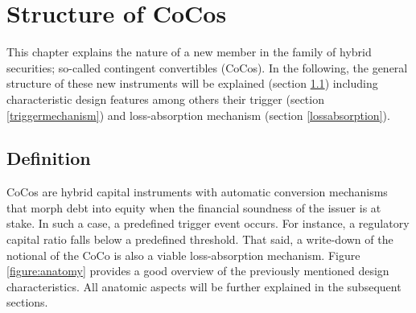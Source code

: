 \chapter{Structure of CoCos}

This chapter explains the nature of a new member in the family of hybrid securities; so-called contingent convertibles (CoCos). In the following, the general structure of these new instruments will be explained (section \ref{definitioncocos}) including characteristic design features among others their trigger (section \ref{triggermechanism}) and loss-absorption mechanism (section \ref{lossabsorption}).

\section{Definition}\label{definitioncocos}

CoCos are hybrid capital instruments with automatic conversion mechanisms that morph debt into equity when the financial soundness of the issuer is at stake. In such a case, a predefined trigger event occurs. For instance, a regulatory capital ratio falls below a predefined threshold. That said, a write-down of the notional of the CoCo is also a viable loss-absorption mechanism. \citep{de2011pricing} Figure \ref{figure:anatomy} provides a good overview of the previously mentioned design characteristics. All anatomic aspects will be further explained in the subsequent sections.\\

